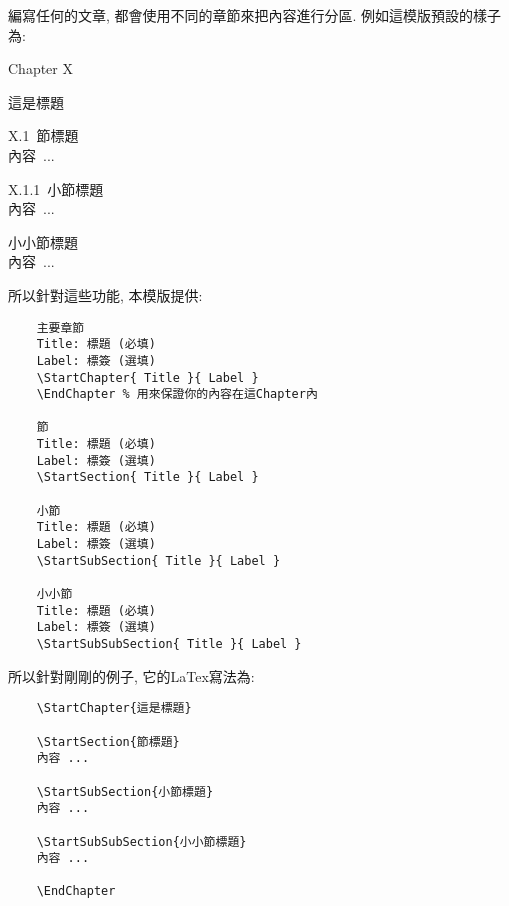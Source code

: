 
編寫任何的文章, 都會使用不同的章節來把內容進行分區. 例如這模版預設的樣子為:
\begin{DescriptionFrame}
  \vspace{0.2cm}
  \centerline{\LARGE Chapter X}
  \vspace{0.3cm}
  \centerline{\LARGE 這是標題}

  \vspace{0.5cm}
  \mbox{\Large X.1 節標題}\\
  \mbox{\hspace{1.2cm}內容 ...}

  \vspace{0.3cm}
  \mbox{\large X.1.1 小節標題}\\
  \mbox{\hspace{1.2cm}內容 ...}

  \vspace{0.3cm}
  \mbox{\large 小小節標題}\\
  \mbox{\hspace{1.2cm}內容 ...}
\end{DescriptionFrame}

所以針對這些功能, 本模版提供:
\begin{DescriptionFrame}
  \begin{verbatim}
    主要章節
    Title: 標題 (必填)
    Label: 標簽 (選填)
    \StartChapter{ Title }{ Label }
    \EndChapter % 用來保證你的內容在這Chapter內

    節
    Title: 標題 (必填)
    Label: 標簽 (選填)
    \StartSection{ Title }{ Label }

    小節
    Title: 標題 (必填)
    Label: 標簽 (選填)
    \StartSubSection{ Title }{ Label }

    小小節
    Title: 標題 (必填)
    Label: 標簽 (選填)
    \StartSubSubSection{ Title }{ Label }
  \end{verbatim}
\end{DescriptionFrame}

所以針對剛剛的例子, 它的LaTex寫法為:\\

\begin{DescriptionFrame}
  \begin{verbatim}
    \StartChapter{這是標題}

    \StartSection{節標題}
    內容 ...

    \StartSubSection{小節標題}
    內容 ...

    \StartSubSubSection{小小節標題}
    內容 ...

    \EndChapter
  \end{verbatim}
\end{DescriptionFrame}
